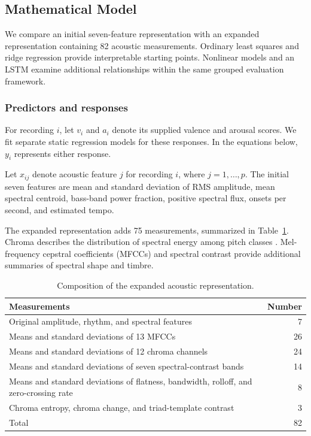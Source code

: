 \subsection{Mathematical Model}
\label{sec:model}

We compare an initial seven-feature representation with an expanded representation containing 82 acoustic measurements. Ordinary least squares and ridge regression provide interpretable starting points. Nonlinear models and an LSTM examine additional relationships within the same grouped evaluation framework.

\subsubsection{Predictors and responses}

For recording $i$, let $v_i$ and $a_i$ denote its supplied valence and arousal scores. We fit separate static regression models for these responses. In the equations below, $y_i$ represents either response.

Let $x_{ij}$ denote acoustic feature $j$ for recording $i$, where $j=1,\ldots,p$. The initial seven features are mean and standard deviation of RMS amplitude, mean spectral centroid, bass-band power fraction, positive spectral flux, onsets per second, and estimated tempo.

The expanded representation adds 75 measurements, summarized in Table~\ref{tab:features}. Chroma describes the distribution of spectral energy among pitch classes \cite{librosachroma}. Mel-frequency cepstral coefficients (MFCCs) and spectral contrast provide additional summaries of spectral shape and timbre.

\begin{table}[ht]
\centering
\caption{Composition of the expanded acoustic representation.}
\label{tab:features}
\begin{tabular}{
    >{\raggedright\arraybackslash}p{}
    r
}
\toprule
Measurements & Number \\
\midrule
Original amplitude, rhythm, and spectral features & 7 \\
Means and standard deviations of 13 MFCCs & 26 \\
Means and standard deviations of 12 chroma channels & 24 \\
Means and standard deviations of seven spectral-contrast bands & 14 \\
Means and standard deviations of flatness, bandwidth, rolloff, and zero-crossing rate & 8 \\
Chroma entropy, chroma change, and triad-template contrast & 3 \\
\midrule
Total & 82 \\
\bottomrule
\end{tabular}
\end{table}

